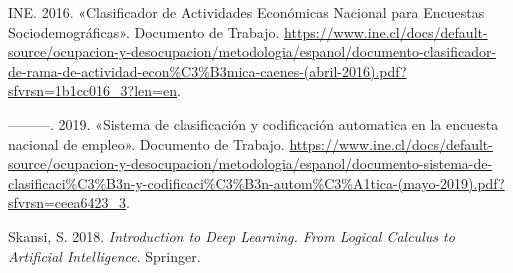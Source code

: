 \documentclass[
  12pt,
  spanish,
]{article}
\begin{document}
\leavevmode\hypertarget{ref-ine_caenes}{}%
INE. 2016. «Clasificador de Actividades Económicas Nacional para
Encuestas Sociodemográficas». Documento de Trabajo.
\url{https://www.ine.cl/docs/default-source/ocupacion-y-desocupacion/metodologia/espanol/documento-clasificador-de-rama-de-actividad-econ\%C3\%B3mica-caenes-(abril-2016).pdf?sfvrsn=1b1cc016_3?len=en}.

\leavevmode\hypertarget{ref-codificacion_ene}{}%
---------. 2019. «Sistema de clasificación y codificación automatica en
la encuesta nacional de empleo». Documento de Trabajo.
\url{https://www.ine.cl/docs/default-source/ocupacion-y-desocupacion/metodologia/espanol/documento-sistema-de-clasificaci\%C3\%B3n-y-codificaci\%C3\%B3n-autom\%C3\%A1tica-(mayo-2019).pdf?sfvrsn=ceea6423_3}.

\leavevmode\hypertarget{ref-skansi}{}%
Skansi, S. 2018. \emph{Introduction to Deep Learning. From Logical
Calculus to Artificial Intelligence}. Springer.
\end{document}

